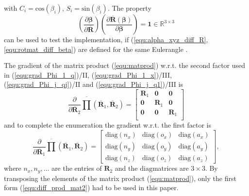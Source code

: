\documentclass[robotics,article,accept,moreauthors,pdftex]{Definitions/mdpi}
\newcommand{\bm}[1]{\boldsymbol{#1}}
\begin{document}
%
with $C_i=\mathrm{cos}(\beta_i)$, $S_i=\mathrm{sin}(\beta_i)$.
The property
%
\begin{equation}
\left(\frac{\partial \bm{\beta}}{\partial \overline{\bm{R}}}\right)
\left(\frac{\partial \overline{\bm{R}}(\bm{\beta})}{\partial \bm{\beta}}\right)
=
\bm{1} \in {\mathbb{R}}^{3 \times 3}
\end{equation}
%
can be used to test the implementation, if (\ref{equ:alpha_xyz_diff_R}, \ref{equ:rotmat_diff_beta}) are defined for the same Euler\replaced[id=Sp]{ }{-}angle\replaced[id=Sp]{ }{-} .

The gradient of the matrix product (\ref{equ:matprod}) w.r.t. the second factor used in (\ref{equ:grad_Phi_1_q})/II, (\ref{equ:grad_Phi_1_x})/III, (\ref{equ:grad_Phi_j_qj})/II and (\ref{equ:grad_Phi_j_q1})/III is
%
\begin{equation}
\frac{\partial }{\partial \overline{\bm{R}}_2}
\overline{\prod}\left( \overline{\bm{R}}_1, \overline{\bm{R}}_2\right)
=
\begin{bmatrix}
\bm{R}_1 & \bm{0} & \bm{0} \\
\bm{0} & \bm{R}_1 & \bm{0} \\
\bm{0} & \bm{0} & \bm{R}_1 \\
\end{bmatrix}
\label{equ:diff_prod_mat2}
\end{equation}
%
and to complete the enumeration the gradient w.r.t. the first factor is
%
\begin{equation}
\frac{\partial }{\partial \overline{\bm{R}}_1}
\overline{\prod}\left( \overline{\bm{R}}_1, \overline{\bm{R}}_2\right)
=
\begin{bmatrix}
{\mathrm{diag}}(n_x)&{\mathrm{diag}}(o_x)&{\mathrm{diag}}(a_x) \\ {\mathrm{diag}}(n_y)&{\mathrm{diag}}(o_y)&{\mathrm{diag}}(a_y)\\ {\mathrm{diag}}(n_z)&{\mathrm{diag}}(o_z)&{\mathrm{diag}}(a_z)
\end{bmatrix},
\label{equ:diff_prod_mat1}
\end{equation}
%
where $n_x,n_y,...$ are the entries of $\bm{R}_2$ and the $\mathrm{diag}$\replaced[id=Sp]{ }{-}matrices are $3 \times 3$.
By transposing the elements of the matrix product (\ref{equ:matprod}), only the first form (\ref{equ:diff_prod_mat2}) had to be used in this paper.

\end{document}
